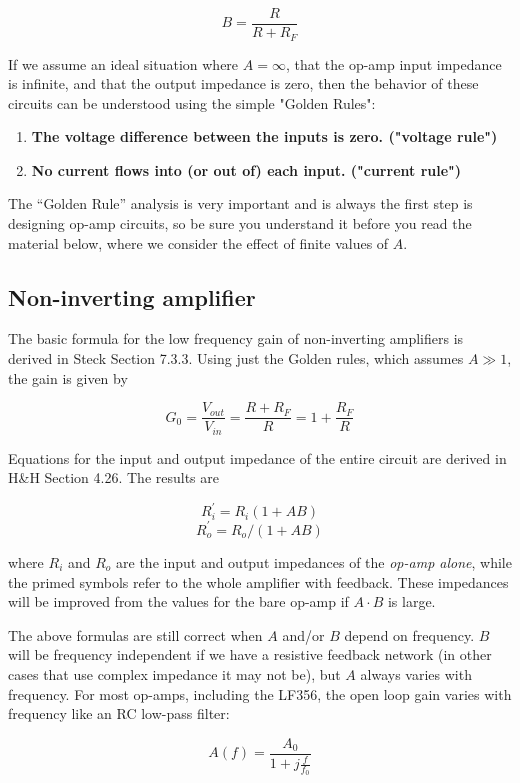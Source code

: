 \documentclass[10pt]{PhysLab1C} %
\begin{document}
\[B = \frac{R}{R + R_{F}}\]

If we assume an ideal situation where \(A = \infty\), that the op-amp input
impedance is infinite, and that the output impedance is zero, then the
behavior of these circuits can be understood using the simple "Golden
Rules":

\begin{enumerate}
\def\labelenumi{\arabic{enumi}.}
\item
  \textbf{The voltage difference between the inputs is zero. ("voltage
  rule")}
\item
  \textbf{No current flows into (or out of) each input. ("current
  rule")}
\end{enumerate}

The ``Golden Rule'' analysis is very important and is always the first
step is designing op-amp circuits, so be sure you understand it before
you read the material below, where we consider the effect of finite
values of $A$.


\subsection{Non-inverting amplifier}


The basic formula for the low frequency gain of non-inverting amplifiers
is derived in Steck Section 7.3.3. Using just the Golden rules, which
assumes \(A\gg 1\), the gain is given by

\[G_{0} = \frac{V_{out}}{V_{in}} =\frac{R+R_F}{R} = 1 + \frac{R_{F}}{R}\]

Equations for the input and output impedance of the entire circuit are
derived in H\&H Section 4.26. The results are

\[R_{i}^{'} = R_{i}(1 + AB)\]
\[R_{o}^{'} = R_{o}/(1 + AB)\]

where \(R_i\) and \(R_o\) are the input and output impedances of the
\emph{op-amp alone}, while the primed symbols refer to the whole
amplifier with feedback. These impedances will be improved from the
values for the bare op-amp if \(A\cdot B\) is large.

The above formulas are still correct when \(A\) and/or \(B\) depend on
frequency. \(B\) will be frequency independent if we have a resistive
feedback network (in other cases that use complex impedance it may not
be), but \(A\) always varies with frequency. For most op-amps, including
the LF356, the open loop gain varies with frequency like an RC low-pass
filter:

\[A(f)=\frac{A_0}{1+j\frac{f}{f_0}}\]
\end{document}
